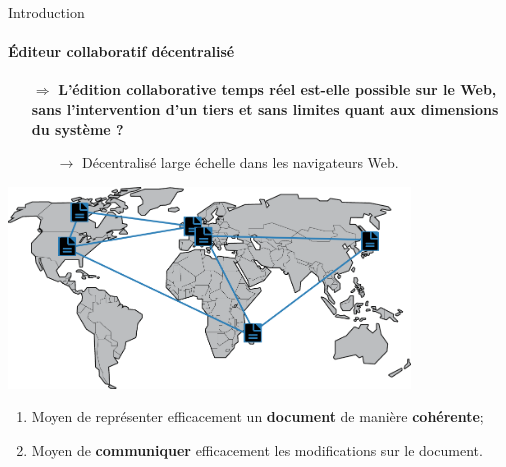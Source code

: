 \begin{frame}{Introduction}\framesubtitle{Éditeur collaboratif décentralisé}
  
  \begin{itemize}
  \item [$\Rightarrow$] \large\textbf{L'édition collaborative temps réel est-elle
      possible sur le Web, sans l'intervention d'un tiers et sans limites quant
      aux dimensions du système ?}
    \begin{itemize}
    \item [$\rightarrow$] Décentralisé large échelle dans les navigateurs Web.
    \end{itemize}
  \end{itemize}
  
  \vspace{0.25cm}
  \begin{center}
    \includegraphics[width=0.8\textwidth]{img/world.png}
  \end{center}
  \vspace{0.25cm}
  
  \begin{enumerate}
    \item Moyen de représenter efficacement un \textbf{document} de manière
      \textbf{cohérente};
    \item Moyen de \textbf{communiquer} efficacement les modifications sur le
      document.
  \end{enumerate}

\end{frame}


